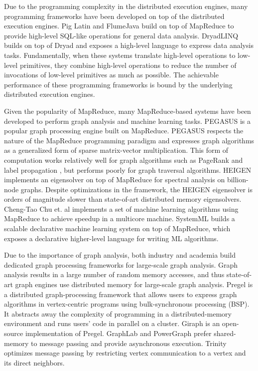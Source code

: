 Due to the programming complexity in the distributed execution engines, many
programming frameworks have been developed on top of the distributed execution
engines. Pig Latin \cite{pig} and FlumeJava \cite{flumejava} build on top of
MapReduce to provide high-level SQL-like operations for general data analysis.
DryadLINQ \cite{dryadlinq} builds on top of Dryad and exposes a high-level
language to express data analysis tasks. Fundamentally, when these systems
translate high-level operations to low-level primitives, they combine high-level
operations to reduce the number of invocations of low-level primitives as much
as possible. The achievable performance of these programming frameworks is
bound by the underlying distributed execution engines.

Given the popularity of MapReduce, many MapReduce-based systems have been
developed to perform graph analysis and machine learning tasks. PEGASUS
\cite{pegasus} is a popular graph processing engine built on MapReduce.
PEGASUS respects the nature of the MapReduce programming paradigm and
expresses
graph algorithms as a generalized form of sparse matrix-vector multiplication.
This form of computation works relatively well for graph algorithms such as
PageRank \cite{pagerank} and label propagation \cite{label_prop}, but performs
poorly for graph traversal algorithms. HEIGEN \cite{heigen} implements
an eigensolver on top of MapReduce for spectral analysis on billion-node
graphs. Despite optimizations in the framework, the HEIGEN eigensolver is
orders of magnitude slower than state-of-art distributed memory eigensolvers.
Cheng-Tao Chu et. al \cite{Chu07} implements a set of machine learning
algorithms using MapReduce to achieve speedup in a multicore machine. SystemML
\cite{systemml} builds a scalable declarative machine learning system on top
of MapReduce, which exposes a declarative higher-level language for writing
ML algorithms.

Due to the importance of graph analysis, both industry and academia build
dedicated graph processing frameworks for large-scale graph analysis.
Graph analysis results in a large number of random memory accesses, and
thus state-of-art graph engines use distributed memory for large-scale
graph analysis.
Pregel \cite{pregel} is a distributed graph-processing framework that
allows users to express graph algorithms in vertex-centric programs  
using bulk-synchronous processing (BSP).
It abstracts away the complexity of programming in a distributed-memory 
environment and runs users' code in parallel on a cluster.
Giraph \cite{giraph} is an open-source implementation of Pregel.
GraphLab \cite{graphlab} and PowerGraph \cite{powergraph} prefer shared-memory
to message passing and provide asynchronous execution.
Trinity \cite{trinity} optimizes message passing by restricting vertex
communication to a vertex and its direct neighbors.

